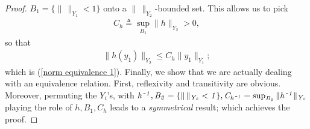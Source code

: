 \begin{proof}
%
  $B_1 = \{ \| \, \|_{Y_1} < 1 \}$ onto %
%
a $\|\,\|_{Y_2}$-bounded set. %
%
This allows us to pick %
%
\begin{align}
  C_h \triangleq \sup_{B_1} \| h \|_{Y_2} > 0, 
\end{align}
%
so that %
%
\begin{align}\label{norm equivalence 2}
  \|h(y_1)\|_{Y_{2}} \leq C_h \|y_1\|_{Y_{1}}; 
\end{align}
%
which is (\ref{norm equivalence 1}). %
%
Finally, we show that we are actually dealing with an equivalence relation. %
First, reflexivity and transitivity are obvious. Moreover, 
permuting the $\mathit{Y}_i$'s, with %
%
  $\mathit{%
  h^{\, \minus 1}, 
  B_2 = \{\| \, \|_{Y_2} < 1 \}, 
  C_{h^{\, \minus 1}} = \sup_{B_2} \| h^{\, \minus 1}\|_{Y_2}
  }$
%
playing the role of $\mathit{h}, \mathit{B_1}, \mathit{C_h}$ %
leads to a \textit{symmetrical} result; which achieves the proof.
\end{proof}
